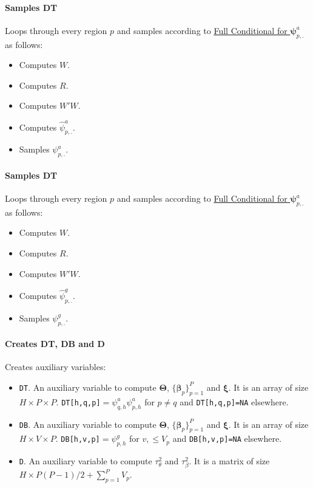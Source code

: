 \documentclass[
]{article}
\providecommand{\tightlist}{%
  \setlength{\itemsep}{0pt}\setlength{\parskip}{0pt}}
\begin{document}
\paragraph{Samples DT}\label{samples-dt}

Loops through every region \(p\) and samples according to
\hyperref[fullConditionalPsiA]{Full Conditional for \( {\boldsymbol \psi} ^a_{p,.}\)} as follows:

\begin{itemize}
\tightlist
\item
  Computes \(W\).
\item
  Computes \(R\).
\item
  Computes \(W'W\).
\item
  Computes \(\hat{\psi}_{p,.}^a\).
\item
  Samples \(\psi_{p,.}^a\).
\end{itemize}

\paragraph{Samples DT}\label{samples-dt-1}

Loops through every region \(p\) and samples according to
\hyperref[fullConditionalPsiA]{Full Conditional for \( {\boldsymbol \psi} ^a_{p,.}\)} as follows:

\begin{itemize}
\tightlist
\item
  Computes \(W\).
\item
  Computes \(R\).
\item
  Computes \(W'W\).
\item
  Computes \(\hat{\psi}_{p,.}^g\).
\item
  Samples \(\psi_{p,.}^g\).
\end{itemize}

\paragraph{Creates DT, DB and D}\label{creates-dt-db-and-d}

Creates auxiliary variables:

\begin{itemize}
\tightlist
\item
  \texttt{DT}. An auxiliary variable to compute \( {\boldsymbol \Theta} \), \(\{ {\boldsymbol \beta} _p\}_{p=1}^P\) and
  \( {\boldsymbol \xi} \). It is an array of size \(H \times P \times P\).
  \texttt{DT{[}h,q,p{]}}\(=\psi^a_{q,h} \psi^a_{p,h}\) for \(p \neq q\) and \texttt{DT{[}h,q,p{]}=NA}
  elsewhere.
\item
  \texttt{DB}. An auxiliary variable to compute \( {\boldsymbol \Theta} \), \(\{ {\boldsymbol \beta} _p\}_{p=1}^P\) and
  \( {\boldsymbol \xi} \). It is an array of size \(H \times V \times P\).
  \texttt{DB{[}h,v,p{]}}\(=\psi^g_{p,h}\) for \(v,\leq V_p\) and \texttt{DB{[}h,v,p{]}=NA} elsewhere.
\item
  \texttt{D}. An auxiliary variable to compute \(\tau^2_\theta\) and \(\tau^2_\beta\).
  It is a matrix of size \(H \times P(P-1)/2 + \sum_{p=1}^P V_p\).
\end{itemize}
\end{document}
